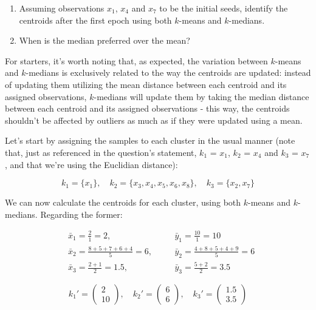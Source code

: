 \documentclass[12pt]{article}
\begin{document}
\begin{enumerate}[leftmargin=\labelsep]
\begin{tcolorbox}[enhanced jigsaw,halign=center,colback=bg,boxrule=0pt,arc=1pt]
    \begin{enumerate}
      \item Assuming observations $x_1$, $x_4$ and $x_7$ to be the initial seeds,
            identify the centroids after the first epoch using both $k$-means and $k$-medians.
      \item When is the median preferred over the mean?
    \end{enumerate}

  \end{tcolorbox}

  For starters, it's worth noting that, as expected, the variation between $k$-means
  and $k$-medians is exclusively related to the way the centroids are updated: instead
  of updating them utilizing the mean distance between each centroid and its assigned
  observations, $k$-medians will update them by taking the median distance between
  each centroid and its assigned observations - this way, the centroids shouldn't
  be affected by outliers as much as if they were updated using a mean.

  Let's start by assigning the samples to each cluster in the usual manner (note that, just as referenced
  in the question's statement, $k_1$ = $x_1$, $k_2$ = $x_4$ and $k_3$ = $x_7$, and that
  we're using the Euclidian distance):

  \begin{equation*}
    k_1 = \{x_1\}, \quad k_2 = \{x_3, x_4, x_5, x_6, x_8\}, \quad k_3 = \{x_2, x_7\}
  \end{equation*}

  We can now calculate the centroids for each cluster, using both $k$-means and $k$-medians.
  Regarding the former:

  \begin{equation*}
    \begin{aligned}
       & \bar{x}_1 = \frac{2}{1} = 2, \quad                 &  & \bar{y}_1 = \frac{10}{1} = 10               \\
       & \bar{x}_2 = \frac{8 + 5 + 7 + 6 + 4}{5} = 6, \quad &  & \bar{y}_2 = \frac{4 + 8 + 5 + 4 + 9}{5} = 6 \\
       & \bar{x}_3 = \frac{2 + 1}{2} = 1.5, \quad           &  & \bar{y}_3 = \frac{5 + 2}{2} = 3.5
    \end{aligned}
  \end{equation*}

  \begin{equation*}
    k_1' = \begin{pmatrix} 2 \\ 10 \end{pmatrix}, \quad
    k_2' = \begin{pmatrix} 6 \\ 6 \end{pmatrix}, \quad
    k_3' = \begin{pmatrix} 1.5 \\ 3.5 \end{pmatrix}
  \end{equation*}


\end{enumerate}
\end{document}
